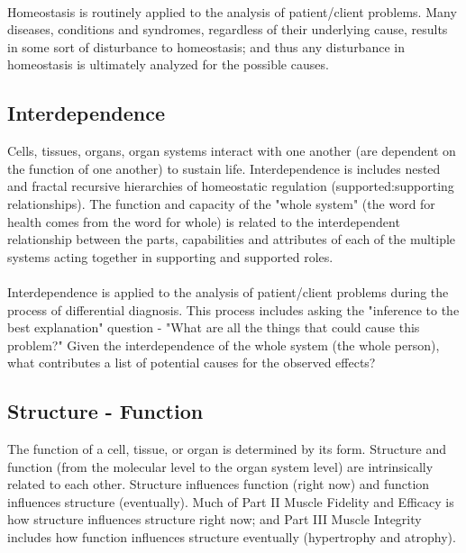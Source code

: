 \paragraph{}
Homeostasis is routinely applied to the analysis of patient/client problems. Many diseases, conditions and syndromes, regardless of their underlying cause, results in some sort of disturbance to homeostasis; and thus any disturbance in homeostasis is ultimately analyzed for the possible causes.

\subsection{Interdependence}
Cells, tissues, organs, organ systems interact with one another (are dependent on the function of one another) to sustain life. Interdependence is includes nested and fractal recursive hierarchies of homeostatic regulation (supported:supporting relationships). The function and capacity of the "whole system" (the word for health comes from the word for whole) is related to the interdependent relationship between the parts, capabilities and attributes of each of the multiple systems acting together in supporting and supported roles. 

\paragraph{}
Interdependence is applied to the analysis of patient/client problems during the process of differential diagnosis. This process includes asking the "inference to the best explanation" question - "What are all the things that could cause this problem?" Given the interdependence of the whole system (the whole person), what contributes a list of potential causes for the observed effects?

\subsection{Structure - Function}
The function of a cell, tissue, or organ is determined by its form. Structure and function (from the molecular level to the organ system level) are intrinsically related to each other. Structure influences function (right now) and function influences structure (eventually). Much of Part II Muscle Fidelity and Efficacy is how structure influences structure right now; and Part III Muscle Integrity includes how function influences structure eventually (hypertrophy and atrophy).


